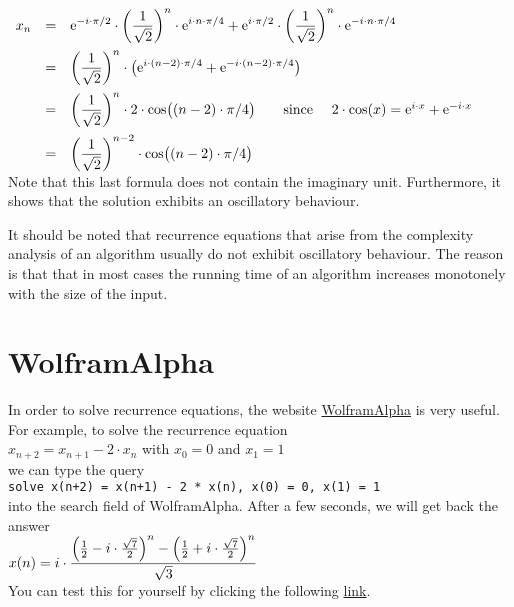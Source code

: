 \\[0.2cm]
\hspace*{1.3cm}
$
\begin{array}{lcl}
  x_n & = & \displaystyle  \mathrm{e}^{-i \cdot\pi/2} \cdot \left(\frac{1}{\sqrt{2}}\right)^n \cdot \mathrm{e}^{ i \cdot n \cdot\pi/4}
               + \mathrm{e}^{ i \cdot\pi/2} \cdot \left(\frac{1}{\sqrt{2}}\right)^n \cdot \mathrm{e}^{-i \cdot n \cdot\pi/4}
  \\[0.4cm]
  & = & \displaystyle \left(\frac{1}{\sqrt{2}}\right)^n \cdot \bigl(
        \mathrm{e}^{i \cdot (n - 2) \cdot \pi / 4} + \mathrm{e}^{-i \cdot (n - 2) \cdot \pi / 4} \bigr) \\[0.4cm]
  & = & \displaystyle \left(\frac{1}{\sqrt{2}}\right)^n \cdot 2 \cdot
        \cos\bigl((n - 2) \cdot \pi / 4\bigr) \qquad 
        \mbox{since \quad $2 \cdot \cos(x) = \mathrm{e}^{i\cdot x} + \mathrm{e}^{-i\cdot x}$}\\[0.4cm]
    & = & \displaystyle \left(\frac{1}{\sqrt{2}}\right)^{n-2} \cdot \cos\bigl((n - 2) \cdot \pi / 4\bigr)
\end{array}
$
\\[0.2cm]
Note that this last formula does not contain the imaginary unit.  Furthermore, it shows that the solution
exhibits an oscillatory behaviour.
\vspace*{0.2cm}

\remark
It should be noted that recurrence equations that arise from the complexity analysis of an algorithm usually do
not exhibit oscillatory behaviour.  The reason is that that in most cases the running time of an algorithm increases
monotonely with the size of the input. \eoxs


\section{WolframAlpha}
In order to solve recurrence equations, the website \href{https://www.wolframalpha.com/}{WolframAlpha}
 is very useful.  For example, to solve the recurrence equation
\\[0.2cm]
\hspace*{1.3cm}
$x_{n+2} = x_{n+1} - 2 \cdot x_n$ \quad with $x_0 = 0$ and $x_1 = 1$ 
\\[0.2cm]
we can type the query
\\[0.2cm]
\hspace*{1.3cm}
\texttt{solve x(n+2) = x(n+1) - 2 * x(n), x(0) = 0, x(1) = 1}
\\[0.2cm]
into the search field of WolframAlpha.  After a few seconds, we will get back the answer
\\[0.2cm]
\hspace*{1.3cm}
$\displaystyle x(n) = i \cdot \frac{\left(\frac{1}{2} - i \cdot\frac{\sqrt{7}}{2}\right)^n -
                          \left(\frac{1}{2} + i \cdot\frac{\sqrt{7}}{2}\right)^n}{\sqrt{3}}$
\\[0.2cm]
You can test this for yourself by clicking the following                        
\href{https://www.wolframalpha.com/input?i=solve+x%28n%2B2%29+%3D+x%28n%2B1%29+-+2+*+x%28n%29%2C+x%280%29+%3D+0%2C+x%281%29+%3D+1}{link}.


